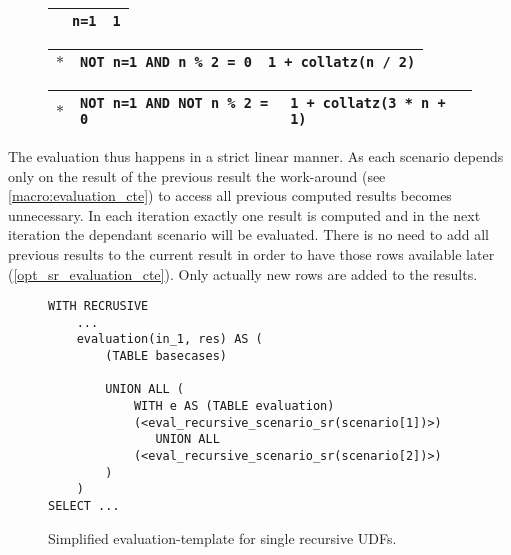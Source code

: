 \begin{figure}[h]
    \centering
    \begin{minipage}[b]{.45\linewidth}
    \centering
    \label{lst:collatz_udf}
    \end{minipage}
    \begin{minipage}[b]{.5\linewidth}
    \centering\scriptsize
        \begin{tabular}{|p{1em}|p{3.3cm}|p{2.9cm}|}\hline
        \cellcolor{gray!25} & \texttt{\phantom{NOT }n=1} & \texttt{1}\\\hline
        \end{tabular}
        
        \begin{tabular}{|p{1em}|p{3.3cm}|p{2.9cm}|}\hline
        \cellcolor{gray!25} $\ast$ & \texttt{NOT n=1 AND \phantom{NOT }n \% 2 = 0} & \texttt{1 + collatz(n / 2)}\\\hline
        \end{tabular}
        
        \begin{tabular}{|p{1em}|p{3.3cm}|p{2.9cm}|}\hline
        \cellcolor{gray!25} $\ast$ & \texttt{NOT n=1 AND NOT n \% 2 = 0} & \texttt{1 + collatz(3 * n + 1)}\\\hline
        \end{tabular}
        \vspace{2em}
    \label{collatz_scenarios}
    \end{minipage}
    \caption{}
    \label{collatz_sql_with_scenarios}
\end{figure}

The evaluation thus happens in a strict linear manner. As each scenario depends only on the result of the previous result the work-around (see \autoref{macro:evaluation_cte}) to access all previous computed results becomes unnecessary. In each iteration exactly one result is computed and in the next iteration the dependant scenario will be evaluated. There is no need to add all previous results to the current result in order to have those rows available later (\autoref{opt_sr_evaluation_cte}). Only actually new rows are added to the results.

\begin{figure}[h!]
    \centering
    \begin{verbatim}
WITH RECRUSIVE
    ...
    evaluation(in_1, res) AS (
        (TABLE basecases)
        
        UNION ALL (
            WITH e AS (TABLE evaluation)
            (<eval_recursive_scenario_sr(scenario[1])>)
               UNION ALL
            (<eval_recursive_scenario_sr(scenario[2])>)
        )
    )
SELECT ...
    \end{verbatim}
    \caption{Simplified evaluation-template for single recursive UDFs.}
    \label{opt_sr_evaluation_cte}
\end{figure}


